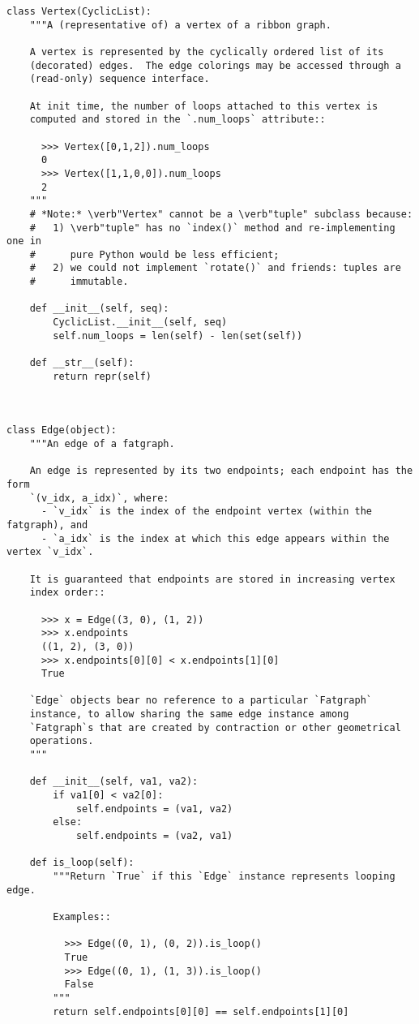 \begin{lstlisting}
class Vertex(CyclicList):
    """A (representative of) a vertex of a ribbon graph.

    A vertex is represented by the cyclically ordered list of its
    (decorated) edges.  The edge colorings may be accessed through a
    (read-only) sequence interface.

    At init time, the number of loops attached to this vertex is
    computed and stored in the `.num_loops` attribute::

      >>> Vertex([0,1,2]).num_loops
      0
      >>> Vertex([1,1,0,0]).num_loops
      2
    """
    # *Note:* \verb"Vertex" cannot be a \verb"tuple" subclass because:
    #   1) \verb"tuple" has no `index()` method and re-implementing one in
    #      pure Python would be less efficient;
    #   2) we could not implement `rotate()` and friends: tuples are
    #      immutable.

    def __init__(self, seq):
        CyclicList.__init__(self, seq)
        self.num_loops = len(self) - len(set(self))

    def __str__(self):
        return repr(self)



class Edge(object):
    """An edge of a fatgraph.

    An edge is represented by its two endpoints; each endpoint has the form
    `(v_idx, a_idx)`, where:
      - `v_idx` is the index of the endpoint vertex (within the fatgraph), and
      - `a_idx` is the index at which this edge appears within the vertex `v_idx`.

    It is guaranteed that endpoints are stored in increasing vertex
    index order::

      >>> x = Edge((3, 0), (1, 2))
      >>> x.endpoints
      ((1, 2), (3, 0))
      >>> x.endpoints[0][0] < x.endpoints[1][0]
      True

    `Edge` objects bear no reference to a particular `Fatgraph`
    instance, to allow sharing the same edge instance among
    `Fatgraph`s that are created by contraction or other geometrical
    operations.
    """

    def __init__(self, va1, va2):
        if va1[0] < va2[0]:
            self.endpoints = (va1, va2)
        else:
            self.endpoints = (va2, va1)

    def is_loop(self):
        """Return `True` if this `Edge` instance represents looping edge.

        Examples::

          >>> Edge((0, 1), (0, 2)).is_loop()
          True
          >>> Edge((0, 1), (1, 3)).is_loop()
          False
        """
        return self.endpoints[0][0] == self.endpoints[1][0]
        

\end{lstlisting}
